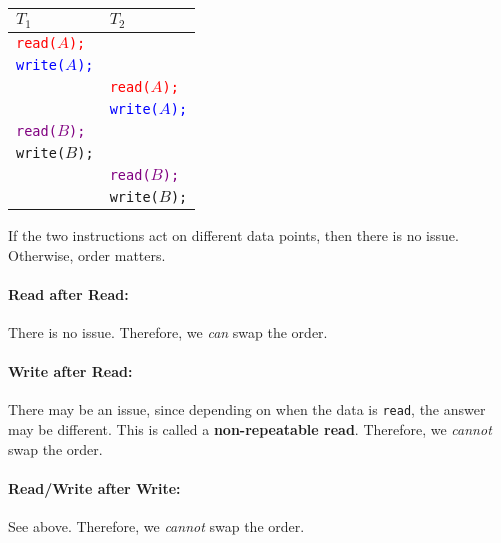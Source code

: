\documentclass{report}
\renewcommand{\bf}[1]{\textbf{{#1}}}
\renewcommand{\tt}[1]{\texttt{{#1}}}
\renewcommand{\it}[1]{\textit{{#1}}}
\begin{document}
{
    \centering
    \begin{tabular}{l|l}
        $T_1$ & $T_2$ \\
        \hline
        \tt{\textcolor{red}{read($A$);}} & \\
        \tt{\textcolor{blue}{write($A$);}} & \\
                                           & \tt{\textcolor{red}{read($A$);}} \\
                                           & \tt{\textcolor{blue}{write($A$);}} \\
        \tt{\textcolor{purple}{read($B$);}} & \\
        \tt{write($B$);} & \\
                     & \tt{\textcolor{purple}{read($B$);}} \\
                     & \tt{write($B$);} \\
    \end{tabular}
    \par
}

If the two instructions act on different data points, then there is no issue.
Otherwise, order matters.

\paragraph{Read after Read:} There is no issue. Therefore, we \it{can} swap the
order.

\paragraph{Write after Read:} There may be an issue, since depending on when the
data is \tt{read}, the answer may be different. This is called a
\bf{non-repeatable read}. Therefore, we \it{cannot} swap the order.

\paragraph{Read/Write after Write:} See above. Therefore, we \it{cannot} swap the
order.
\end{document}
